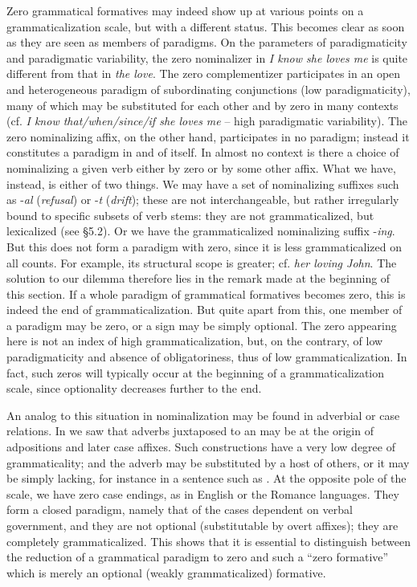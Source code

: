Zero grammatical formatives may indeed show up at various points on a grammaticalization scale, but with a different status. This becomes clear as soon as they are seen as members of paradigms. On the parameters of paradigmaticity and paradigmatic variability, the zero nominalizer in \textit{I know she loves me} is quite different from that in \textit{the love}. The zero complementizer participates in an open and heterogeneous paradigm of subordinating conjunctions (low paradigmaticity), many of which may be substituted for each other and by zero in many contexts (cf. \textit{I know that/when/since/if she loves me} -- high paradigmatic variability). The zero nominalizing affix, on the other hand, participates in no paradigm; instead it constitutes a paradigm in and of itself. In almost no context is there a choice of nominalizing a given verb either by zero or by some other affix. What we have, instead, is either of two things. We may have a set of nominalizing suffixes such as -\textit{al} (\textit{refusal}) or -\textit{t} (\textit{drift}); these are not interchangeable, but rather irregularly bound to specific subsets of verb stems: they are not grammaticalized, but lexicalized (see §5.2). Or we have the grammaticalized nominalizing suffix -\textit{ing}. But this does not form a paradigm with zero, since it is less grammaticalized on all counts. For example, its structural scope is greater; cf. \textit{her loving John}. The solution to our dilemma therefore lies in the remark made at the beginning of this section. If a whole paradigm of grammatical formatives becomes zero, this is indeed the end of grammaticalization. But quite apart from this, one member of a paradigm may be zero, or a sign may be simply optional. The zero appearing here is not an index of high grammaticalization, but, on the contrary, of low paradigmaticity and absence of obligatoriness, thus of low grammaticalization. In fact, such zeros will typically occur at the beginning of a grammaticalization scale, since optionality decreases further to the end.

An analog to this situation in nominalization may be found in adverbial or case relations. In  we saw that adverbs juxtaposed to an \np may be at the origin of adpositions and later case affixes. Such constructions have a very low degree of grammaticality; and the adverb may be substituted by a host of others, or it may be simply lacking, for instance in a sentence such as . At the opposite pole of the scale, we have zero case endings, as in English or the Romance languages. They form a closed paradigm, namely that of the cases dependent on verbal government, and they are not optional (substitutable by overt affixes); they are completely grammaticalized. This shows that it is essential to distinguish between the reduction of a grammatical paradigm to zero and such a “zero formative” which is merely an optional (weakly grammaticalized) formative.

